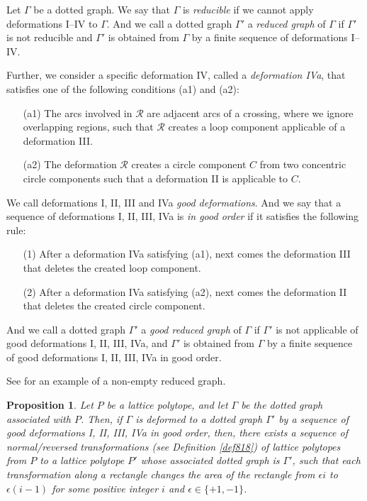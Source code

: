 \documentclass[a4paper,11pt]{amsart}
\numberwithin{equation}{section}
\newtheorem{proposition}[theorem]{Proposition}
\begin{document}
\begin{definition}\label{def3-3}
Let $\Gamma$ be a dotted graph. We say that $\Gamma$ is  {\it reducible} if we cannot apply deformations I--IV to $\Gamma$. 
And we call a dotted graph $\Gamma'$ a {\it reduced graph} of 
$\Gamma$ if $\Gamma'$ is not reducible and $\Gamma'$ is obtained from $\Gamma$ by a finite sequence of deformations I--IV. 


Further, we consider a specific deformation IV, called a {\it deformation IVa}, that satisfies one of the following conditions (a1) and  (a2):

\begin{enumerate}

\item[(a1)]
The arcs involved in $\mathcal{R}$ are adjacent arcs of a crossing, where we ignore overlapping regions, such that $\mathcal{R}$ creates a loop component applicable of a deformation III. 

\item[(a2)]
The deformation $\mathcal{R}$ creates a circle component $C$ from two concentric circle components such that a deformation II is applicable to $C$. 
\end{enumerate}

We call deformations I, II, III and IVa {\it good deformations}. 
And we say that a sequence of deformations I, II, III, IVa is {\it in  good order} if it satisfies the following rule: 
\begin{enumerate}
\item[(1)]
After a deformation IVa satisfying (a1), next comes the deformation III that deletes the created loop component. 

\item[(2)]
After a deformation IVa satisfying (a2), next comes the deformation II that deletes the created circle component. 
\end{enumerate}

And we call a dotted graph $\Gamma'$ a {\it good reduced graph} of 
$\Gamma$ if $\Gamma'$ is not applicable of good deformations I, II, III, IVa, and $\Gamma'$ is obtained from $\Gamma$ by a finite sequence of good deformations I, II, III, IVa in good order.  


\end{definition}

See \cite[Figure 6.2]{N} for an example of a non-empty reduced graph. 



\begin{proposition}\label{prop919}
Let $P$ be a lattice polytope, and let $\Gamma$ be the dotted graph associated with $P$. 
Then, if $\Gamma$ is deformed to a dotted graph $\Gamma'$ by a sequence of good deformations I, II, III, IVa in good order, then, 
there exists a sequence of normal/reversed transformations (see Definition \ref{def818}) of lattice polytopes from $P$ to a lattice polytope $P'$ whose associated dotted graph is $\Gamma'$, such that each transformation along a rectangle changes the area of the rectangle from $\epsilon i$ to $\epsilon (i-1)$ for some positive integer $i$ and $\epsilon\in \{+1, -1\}$. 
\end{proposition}
\end{document}
